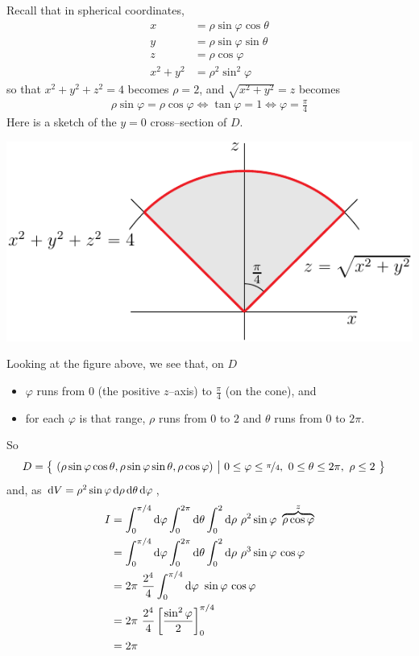\begin{solution}
Recall that in spherical coordinates,
\begin{align*}
x&=\rho\sin\varphi\cos\theta \\
y&=\rho\sin\varphi\sin\theta \\
z&=\rho\cos\varphi \\
x^2+y^2 &=\rho^2\sin^2\varphi
\end{align*}
so that $x^2+y^2+z^2= 4$ becomes $\rho = 2$,
and $\sqrt{x^2+y^2}= z$ becomes
\begin{align*}
\rho\sin\varphi = \rho\cos\varphi 
\iff
\tan\varphi= 1
\iff
\varphi=\frac{\pi}{4}
\end{align*}
Here is a sketch of the $y=0$ cross--section of $D$.
\begin{center}
     \includegraphics[scale=1.0]{fig/OE06D_6b.pdf}
\end{center}
Looking at the figure above, we see that, on $D$
\begin{itemize}
\item 
  $\varphi$ runs from $0$ (the positive $z$--axis) to
    $\frac{\pi}{4}$ (on the cone), and
\item
  for each $\varphi$ is that range, $\rho$ runs from $0$  to $2$
  and $\theta$ runs from $0$ to $2\pi$.
\end{itemize}
So
\begin{align*}
D&=\Set{(\rho\sin\varphi\cos\theta,\rho\sin\varphi\sin\theta,\rho\cos\varphi)}
 {0\le\varphi\le\nicefrac{\pi}{4},\ 
     0\le \theta\le 2\pi,\ \rho\le 2}
\end{align*}
and, as $\mathrm{d}V =\rho^2\sin\varphi\,\mathrm{d}\rho\,\mathrm{d}\theta\,\mathrm{d}\varphi$,
\begin{align*}
I&= \int_0^{\pi/4}\dee{\varphi}\int_0^{2\pi}\dee{\theta}
            \int_0^{2}\dee{\rho}\ 
             \rho^2\sin\varphi\ \overbrace{\rho\cos\varphi}^{z} \\
&= \int_0^{\pi/4}\dee{\varphi}\int_0^{2\pi}\dee{\theta}
            \int_0^{2}\dee{\rho}\ 
                  \rho^3\sin\varphi\,\cos\varphi \\
&= 2\pi\ \frac{2^4}{4} \int_0^{\pi/4}\dee{\varphi}\ \sin\varphi\,\cos\varphi \\
&= 2\pi\ \frac{2^4}{4}\left[\frac{\sin^2\varphi}{2}\right]_0^{\pi/4} \\
&= 2\pi
\end{align*}
\end{solution}

